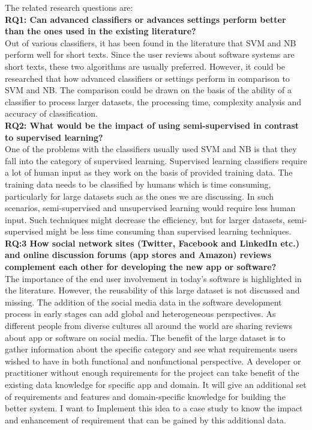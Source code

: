 The related research questions are:\\

\textbf{RQ1: Can advanced classifiers or advances settings perform better than the ones used in the existing
literature?}\\
Out of various classifiers, it has been found in the literature that SVM and NB perform well for
short texts. Since the user reviews about software systems are short texts, these two algorithms
are usually preferred. However, it could be researched that how advanced classifiers or settings perform
in comparison to SVM and NB. The comparison could be drawn on the basis of the ability of a
classifier to process larger datasets, the processing time, complexity analysis and accuracy of
classification.\\

\textbf{RQ2: What would be the impact of using semi-supervised in
contrast to supervised learning?}\\
One of the problems with the classifiers usually used SVM and NB is that they fall into the
category of supervised learning. Supervised learning classifiers require a lot of human input as
they work on the basis of provided training data. The training data needs to be classified by
humans which is time consuming, particularly for large datasets such as the ones we are
discussing. In such scenarios, semi-supervised and unsupervised learning would require
less human input. Such techniques might decrease the efficiency, but for larger datasets, semi-supervised
might be less time consuming than supervised learning
techniques.\\

\textbf{RQ:3 How social network sites (Twitter, Facebook and LinkedIn etc.) and online discussion
forums (app stores and Amazon) reviews complement each other for developing the new
app or software?}\\
The importance of the end user involvement in today’s software is highlighted
in the literature. However, the reusability of this large dataset is not discussed and missing. The
addition of the social media data in the software development process in early stages can add
global and heterogeneous perspectives. As different people from diverse cultures all around the world are sharing reviews about app or software on social media. The benefit of the large dataset is to gather information
about the specific category and see what requirements users wished to have in both functional and
nonfunctional perspective. A developer or practitioner without enough requirements for the project
 can take benefit of the existing data knowledge for
 specific app and domain. It will give an additional set of requirements and features and
domain-specific knowledge for building the better system. I want to Implement this idea to a case
study to know the impact and enhancement of requirement that can be gained by this additional
data.

